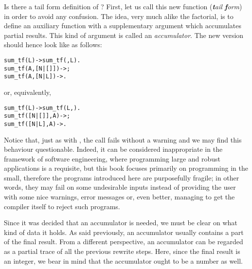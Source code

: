 Is there a tail form definition of ? First, let us call
this new function  (\emph{\textbf{t}ail
  \textbf{f}orm}) in order to avoid any confusion. The idea, very much
alike the factorial, is to define an auxiliary function
 with a supplementary argument which accumulates
partial results. This kind of argument is called an
\emph{accumulator}. The new version should hence look like as follows:
\begin{alltt}
sum_tf(L)        -> sum_tf(,L).
sum_tf(A,[N|[]]) -> ;
sum_tf(A,[N| L]) -> .
\end{alltt}
or, equivalently,
\begin{alltt}
sum_tf(L)        -> sum_tf(L,).
sum_tf([N|[]],A) -> ;
sum_tf([N| L],A) -> .
\end{alltt}
Notice that, just as with , the call
 fails without a warning and we may find this
behaviour questionable. Indeed, it can be considered inappropriate in
the framework of software engineering, where programming large and
robust applications is a requisite, but this book focuses primarily on
programming in the small, therefore the programs introduced here are
purposefully fragile; in other words, they may fail on some
undesirable inputs instead of providing the user with some nice
warnings, error messages or, even better, managing to get the compiler
itself to reject such programs.

Since it was decided that an accumulator is needed, we must be clear
on what kind of data it holds. As said previously, an accumulator
usually contains a part of the final result. From a different
perspective, an accumulator can be regarded as a partial trace of all
the previous rewrite steps. Here, since the final result is an
integer, we bear in mind that the accumulator ought to be a number as
well.

